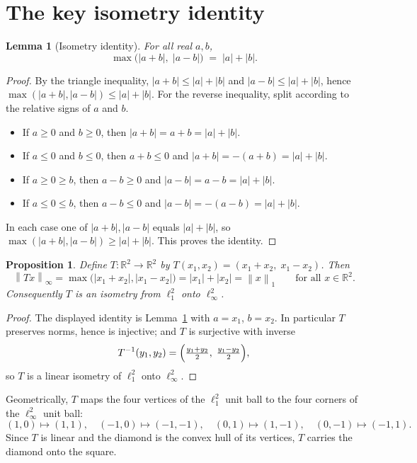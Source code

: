 \documentclass[11pt]{article}
\newtheorem{proposition}[theorem]{Proposition}
\newtheorem{lemma}[theorem]{Lemma}
\theoremstyle{definition}
\theoremstyle{remark}
\newcommand{\R}{\mathbb{R}}
\newcommand{\norm}[1]{\left\lVert #1 \right\rVert}
\newcommand{\linf}{\ell_\infty}
\newcommand{\lone}{\ell_1}
\begin{document}
\section{The key isometry identity}

\begin{lemma}[Isometry identity]\label{lem:identity}
For all real $a,b$,
\[
  \max\bigl(|a+b|,\;|a-b|\bigr) \;=\; |a|+|b|.
\]
\end{lemma}

\begin{proof}
By the triangle inequality, $|a+b|\le|a|+|b|$ and $|a-b|\le|a|+|b|$, hence
$\max(|a+b|,|a-b|)\le|a|+|b|$. For the reverse inequality, split according to
the relative signs of $a$ and $b$.
\begin{itemize}
\item If $a\ge0$ and $b\ge0$, then $|a+b|=a+b=|a|+|b|$.
\item If $a\le0$ and $b\le0$, then $a+b\le0$ and $|a+b|=-(a+b)=|a|+|b|$.
\item If $a\ge0\ge b$, then $a-b\ge0$ and $|a-b|=a-b=|a|+|b|$.
\item If $a\le0\le b$, then $a-b\le0$ and $|a-b|=-(a-b)=|a|+|b|$.
\end{itemize}
In each case one of $|a+b|,|a-b|$ equals $|a|+|b|$, so
$\max(|a+b|,|a-b|)\ge|a|+|b|$. This proves the identity.
\end{proof}

\begin{proposition}\label{prop:isometry}
Define $T:\R^2\to\R^2$ by $T(x_1,x_2)=(x_1+x_2,\;x_1-x_2)$. Then
\[
  \norm{Tx}_\infty=\max\bigl(|x_1+x_2|,|x_1-x_2|\bigr)=|x_1|+|x_2|=\norm{x}_1
  \qquad\text{for all }x\in\R^2 .
\]
Consequently $T$ is an isometry from $\lone^2$ onto $\linf^2$.
\end{proposition}

\begin{proof}
The displayed identity is Lemma~\ref{lem:identity} with $a=x_1$, $b=x_2$. In
particular $T$ preserves norms, hence is injective; and $T$ is surjective with
inverse
\[
  T^{-1}(y_1,y_2)=\Bigl(\tfrac{y_1+y_2}{2},\;\tfrac{y_1-y_2}{2}\Bigr),
\]
so $T$ is a linear isometry of $\lone^2$ onto $\linf^2$.
\end{proof}

Geometrically, $T$ maps the four vertices of the $\lone^2$ unit ball to the
four corners of the $\linf^2$ unit ball:
\[
  (1,0)\mapsto(1,1),\quad
  (-1,0)\mapsto(-1,-1),\quad
  (0,1)\mapsto(1,-1),\quad
  (0,-1)\mapsto(-1,1).
\]
Since $T$ is linear and the diamond is the convex hull of its vertices, $T$
carries the diamond onto the square.
\end{document}
